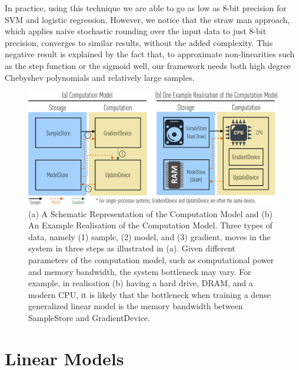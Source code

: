\documentclass{article}
\begin{document}
In practice, using this technique we are
able to go as low as 8-bit precision for SVM and logistic regression. 
However, we notice that the straw man approach, which applies naive stochastic rounding over the input data to just 8-bit precision, converges to similar results, 
without the added complexity. 
This negative result is explained by the fact that, to approximate non-linearities such as the step function or the sigmoid well, our framework needs both high degree Chebyshev polynomials and relatively large samples. 

\begin{figure}[t]
\centering   
\includegraphics[scale=0.4]{compmodel-pdfcrop}
\caption{(a) A Schematic Representation of the Computation Model and (b) An Example Realisation
of the Computation Model. Three types of
data, namely (1) sample, (2) model, and (3)
gradient, moves in the system in three
steps as illustrated in (a). Given
different parameters of the computation model,
such as computational power and memory bandwidth, the system bottleneck may
vary. For example, in 
realisation (b) having a hard drive, DRAM, and a
modern CPU, it is likely that the  bottleneck when training 
a dense generalized linear model is the
memory bandwidth between SampleStore
and GradientDevice.}
\label{fig:model}
\end{figure}


\section{Linear Models}
\end{document}
